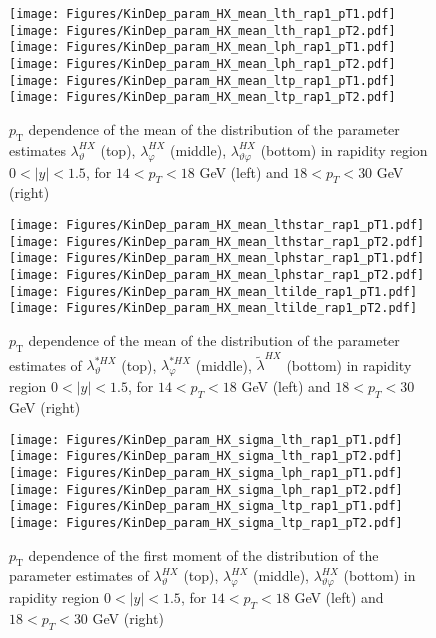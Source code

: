 \documentclass[12pt]{article}
\newcommand{\pT}{p_\mathrm{T}}
\newcommand{\absy}{\left |  y \right |}
\newcommand{\lamthHX}{\lambda^{\scriptscriptstyle HX}_\vartheta}
\newcommand{\lamphHX}{\lambda^{\scriptscriptstyle HX}_\varphi}
\newcommand{\lamthphHX}{\lambda^{\scriptscriptstyle HX}_{\vartheta \varphi}}
\newcommand{\lamtildeHX}{\tilde{\lambda}^{\scriptscriptstyle HX}}
\newcommand{\lamthstarHX}{\lambda^{* \scriptscriptstyle HX}_\vartheta}
\newcommand{\lamphstarHX}{\lambda^{* \scriptscriptstyle HX}_\varphi}
\begin{document}



\begin{figure}[htbp]
\centering
\texttt{[image: Figures/KinDep\_param\_HX\_mean\_lth\_rap1\_pT1.pdf]}
\texttt{[image: Figures/KinDep\_param\_HX\_mean\_lth\_rap1\_pT2.pdf]}
\texttt{[image: Figures/KinDep\_param\_HX\_mean\_lph\_rap1\_pT1.pdf]}
\texttt{[image: Figures/KinDep\_param\_HX\_mean\_lph\_rap1\_pT2.pdf]}
\texttt{[image: Figures/KinDep\_param\_HX\_mean\_ltp\_rap1\_pT1.pdf]}
\texttt{[image: Figures/KinDep\_param\_HX\_mean\_ltp\_rap1\_pT2.pdf]}
\caption{$\pT$ dependence of the mean of the distribution of the parameter estimates $\lamthHX$ (top), $\lamphHX$ (middle), $\lamthphHX$ (bottom) in rapidity region $0<\absy<1.5$, for $14 < p_T < 18$ GeV (left) and
$18 < p_T < 30$ GeV (right)}
\end{figure}
\clearpage

\begin{figure}[htbp]
\centering
\texttt{[image: Figures/KinDep\_param\_HX\_mean\_lthstar\_rap1\_pT1.pdf]}
\texttt{[image: Figures/KinDep\_param\_HX\_mean\_lthstar\_rap1\_pT2.pdf]}
\texttt{[image: Figures/KinDep\_param\_HX\_mean\_lphstar\_rap1\_pT1.pdf]}
\texttt{[image: Figures/KinDep\_param\_HX\_mean\_lphstar\_rap1\_pT2.pdf]}
\texttt{[image: Figures/KinDep\_param\_HX\_mean\_ltilde\_rap1\_pT1.pdf]}
\texttt{[image: Figures/KinDep\_param\_HX\_mean\_ltilde\_rap1\_pT2.pdf]}
\caption{$\pT$ dependence of the mean of the distribution of the parameter estimates of $\lamthstarHX$ (top), $\lamphstarHX$ (middle), $\lamtildeHX$ (bottom) in rapidity region $0<\absy<1.5$, for $14 < p_T < 18$ GeV (left) and
$18 < p_T < 30$ GeV (right)}
\end{figure}
\clearpage


\begin{figure}[htbp]
\centering
\texttt{[image: Figures/KinDep\_param\_HX\_sigma\_lth\_rap1\_pT1.pdf]}
\texttt{[image: Figures/KinDep\_param\_HX\_sigma\_lth\_rap1\_pT2.pdf]}
\texttt{[image: Figures/KinDep\_param\_HX\_sigma\_lph\_rap1\_pT1.pdf]}
\texttt{[image: Figures/KinDep\_param\_HX\_sigma\_lph\_rap1\_pT2.pdf]}
\texttt{[image: Figures/KinDep\_param\_HX\_sigma\_ltp\_rap1\_pT1.pdf]}
\texttt{[image: Figures/KinDep\_param\_HX\_sigma\_ltp\_rap1\_pT2.pdf]}
\caption{$\pT$ dependence of the first moment of the distribution of the parameter estimates of $\lamthHX$ (top), $\lamphHX$ (middle), $\lamthphHX$ (bottom) in rapidity region $0<\absy<1.5$, for $14 < p_T < 18$ GeV (left) and
$18 < p_T < 30$ GeV (right)}
\end{figure}
\clearpage
\end{document}
